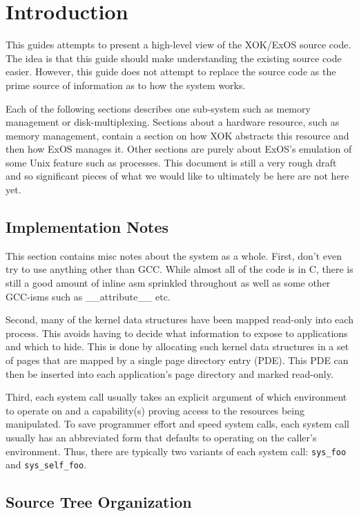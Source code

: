 \section{Introduction}

This guides attempts to present a high-level view of the XOK/ExOS
source code. The idea is that this guide should make understanding the
existing source code easier. However, this guide does not attempt to
replace the source code as the prime source of information as to how the
system works.

Each of the following sections describes one sub-system such as memory
management or disk-multiplexing. Sections about a hardware resource,
such as memory management, contain a section on how XOK abstracts this
resource and then how ExOS manages it. Other sections are purely about
ExOS's emulation of some Unix feature such as processes. This document
is still a very rough draft and so significant pieces of what we
would like to ultimately be here are not here yet.

\subsection {Implementation Notes}

This section contains misc notes about the system as a whole. First, 
don't even try to use anything other than GCC. While almost all
of the code is in C, there is still a good amount of inline
asm sprinkled throughout as well as some other GCC-isms such
as \_\_attribute\_\_ etc.

Second, many of the kernel data structures have been mapped read-only
into each process. This avoids having to decide what information
to expose to applications and which to hide. This is done by allocating
such kernel data structures in a set of pages that are mapped by a single
page directory entry (PDE).  This PDE can then be inserted into
each application's page directory and marked read-only. 

Third, each system call usually takes an explicit argument of
which environment to operate on and a capability(s) proving
access to the resources being manipulated. To save programmer
effort and speed system calls, each system call usually has
an abbreviated form that defaults to operating on the caller's
environment. Thus, there are typically two variants of each
system call: {\tt sys\_foo} and {\tt sys\_self\_foo}.

\subsection {Source Tree Organization}

